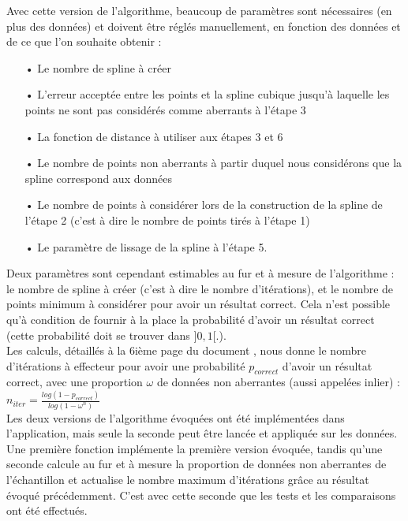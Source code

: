 \documentclass[a4paper,12pt]{article} %
\begin{document}
                    
                    Avec cette version de l'algorithme, beaucoup de paramètres sont nécessaires (en plus des données) et doivent être réglés manuellement, en fonction des données et de ce que l'on souhaite obtenir :
                    \begin{itemize}
                    \item[•] Le nombre de spline à créer
                    \item[•]  L'erreur acceptée entre les points et la spline cubique jusqu'à laquelle les points ne sont pas considérés comme aberrants à l'étape 3
                    \item[•]  La fonction de distance à utiliser aux étapes 3 et 6
                    \item[•] Le nombre de points non aberrants à partir duquel nous considérons que la spline correspond aux données
                    \item[•]  Le nombre de points à considérer lors de la construction de la spline de l'étape 2 (c'est à dire le nombre de points tirés à l'étape 1)
                    \item[•] Le paramètre de lissage de la spline à l'étape 5.
                    \end{itemize}
                    
                    Deux paramètres sont cependant estimables au fur et à mesure de l'algorithme :\\ le nombre de spline à créer (c'est à dire le nombre d'itérations), et le nombre de points minimum à considérer pour avoir un résultat correct. Cela n'est possible qu'à condition de fournir à la place la probabilité d'avoir un résultat correct (cette probabilité doit se trouver dans $]0,1[$.). \\
                    Les calculs, détaillés à la 6ième page du document \cite{RANSAC}, nous donne le nombre d'itérations à effecteur pour avoir une probabilité $p_{correct}$ d'avoir un résultat correct, avec une proportion $\omega$ de données non aberrantes (aussi appelées inlier) : $n_{iter} = \frac{log(1 - p_{correct})}{log(1 - \omega^n)}$\\
                    
                    Les deux versions de l'algorithme évoquées ont été implémentées dans l'application, mais seule la seconde peut être lancée et appliquée sur les données.
                    Une première fonction implémente la première version évoquée, tandis qu'une seconde calcule au fur et à mesure la proportion de données non aberrantes de l'échantillon et actualise le nombre maximum d'itérations grâce au résultat évoqué précédemment.
                    C'est avec cette seconde que les tests et les comparaisons ont été effectués.\\
                    
\end{document}

